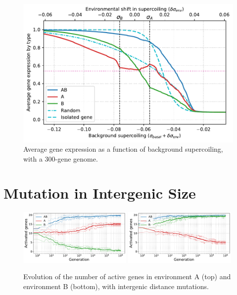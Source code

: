 \begin{figure}[H]
\centering
\includegraphics[width=\textwidth]{param/300-genes/activity_sigmas_avg.pdf}
\caption[Average gene expression as a function of background supercoiling, with a 300-gene genome]{Average gene expression as a function of background supercoiling, with a 300-gene genome.}
\end{figure}








\FloatBlock

\section{Mutation in Intergenic Size}


\begin{figure}[H]
  \centering
  \includegraphics[width=0.49\textwidth]{param/evolve-intergene/gene_activity_env_A.pdf}
  \includegraphics[width=0.49\textwidth]{param/evolve-intergene/gene_activity_env_B.pdf}
  \caption[Evolution of the number of active genes in each environment, with intergenic distance mutations]{Evolution of the number of active genes in environment A (top) and environment B (bottom), with intergenic distance mutations.}
  \end{figure}


